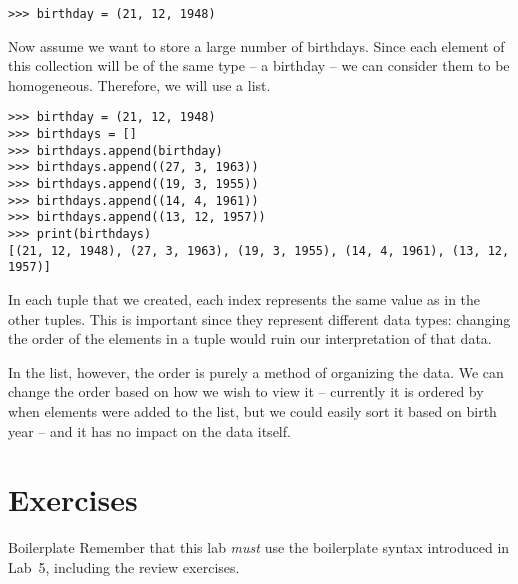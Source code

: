 \documentclass[11pt]{cselabheader}
\begin{document}
\begin{lstlisting}[style=ipython]
>>> birthday = (21, 12, 1948)
\end{lstlisting}

Now assume we want to store a large number of birthdays. Since each element of this collection will be of the same type -- a birthday -- we can consider them to be homogeneous. Therefore, we will use a list.

\begin{lstlisting}[style=ipython]
>>> birthday = (21, 12, 1948)
>>> birthdays = []
>>> birthdays.append(birthday)
>>> birthdays.append((27, 3, 1963))
>>> birthdays.append((19, 3, 1955))
>>> birthdays.append((14, 4, 1961))
>>> birthdays.append((13, 12, 1957))
>>> print(birthdays)
[(21, 12, 1948), (27, 3, 1963), (19, 3, 1955), (14, 4, 1961), (13, 12, 1957)]
\end{lstlisting}

In each tuple that we created, each index represents the same value as in the other tuples. This is important since they represent different data types: changing the order of the elements in a tuple would ruin our interpretation of that data.

In the list, however, the order is purely a method of organizing the data. We can change the order based on how we wish to view it -- currently it is ordered by when elements were added to the list, but we could easily sort it based on birth year -- and it has no impact on the data itself.


\pagebreak




\section{Exercises}
\label{sec:ex}

\begin{warningbox}{Boilerplate}
  Remember that this lab \emph{must} use the
  boilerplate syntax introduced in Lab~5, including the review exercises.
\end{warningbox}
\end{document}
